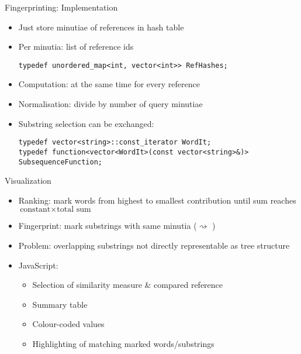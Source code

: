 \documentclass[simple]{mybeamer}
\begin{document}
\begin{frame}[fragile]{Fingerprinting: Implementation}
    \begin{itemize}
      \item Just store minutiae of references in hash table
      \item Per minutia: list of reference ids
\begin{lstlisting}
typedef unordered_map<int, vector<int>> RefHashes;
\end{lstlisting}
      
      \pause
      
      \item Computation: at the same time for every reference
      \item Normalisation: divide by number of query minutiae
      
      \pause
      
      \item Substring selection can be exchanged:
\begin{lstlisting}
typedef vector<string>::const_iterator WordIt;
typedef function<vector<WordIt>(const vector<string>&)> SubsequenceFunction;
\end{lstlisting} 
    \end{itemize}
\end{frame}

\begin{frame}{Visualization}
  \begin{itemize}
    \item Ranking: mark words from highest to smallest contribution until
    sum reaches $\text{constant}\times\text{total sum}$
    \item Fingerprint: mark substrings with same minutia ($\rightsquigarrow$ )
    \item Problem: overlapping substrings not directly representable as tree structure
    
    \pause
    
    \item JavaScript: 
    \begin{itemize}
      \item Selection of similarity measure \& compared reference
      \item Summary table
      \item Colour-coded values
      \item Highlighting of matching marked words/substrings
    \end{itemize}
  \end{itemize}
\end{frame}
\end{document}
